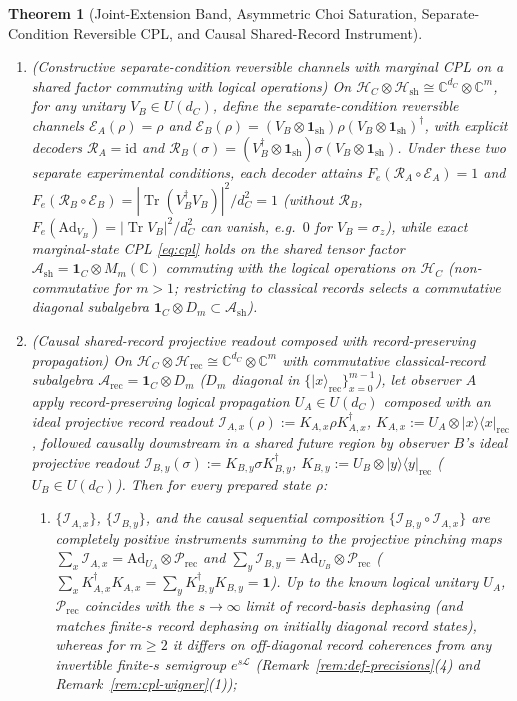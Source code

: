 \documentclass[11pt,a4paper]{article}
\newtheorem{theorem}{Theorem}
\theoremstyle{definition}
\theoremstyle{remark}
\newcommand{\Tr}{\operatorname{Tr}}
\newcommand{\id}{\mathrm{id}}
\newcommand{\cH}{\mathcal{H}}
\newcommand{\cA}{\mathcal{A}}
\newcommand{\cL}{\mathcal{L}}
\newcommand{\cE}{\mathcal{E}}
\newcommand{\cR}{\mathcal{R}}
\newcommand{\cP}{\mathcal{P}}
\newcommand{\cI}{\mathcal{I}}
\newcommand{\bbC}{\mathbb{C}}
\newcommand{\1}{\mathbf{1}}
\begin{document}
\begin{theorem}[Joint-Extension Band, Asymmetric Choi Saturation, Separate-Condition Reversible CPL, and Causal Shared-Record Instrument]
\begin{enumerate}
  \item[(d)] \emph{(Constructive separate-condition reversible channels with marginal CPL on a shared factor commuting with logical operations)} On $\cH_C \otimes \cH_{\mathrm{sh}} \cong \bbC^{d_C} \otimes \bbC^m$, for any unitary $V_B \in U(d_C)$, define the separate-condition reversible channels $\cE_A(\rho) = \rho$ and $\cE_B(\rho) = (V_B\otimes\1_{\mathrm{sh}})\rho(V_B\otimes\1_{\mathrm{sh}})^\dagger$, with explicit decoders $\cR_A = \id$ and $\cR_B(\sigma) = (V_B^\dagger\otimes\1_{\mathrm{sh}})\sigma(V_B\otimes\1_{\mathrm{sh}})$. Under these two separate experimental conditions, each decoder attains $F_e(\cR_A\circ\cE_A) = 1$ and $F_e(\cR_B\circ\cE_B) = |\Tr(V_B^\dagger V_B)|^2/d_C^2 = 1$ (without $\cR_B$, $F_e(\mathrm{Ad}_{V_B}) = |\Tr V_B|^2/d_C^2$ can vanish, e.g.\ $0$ for $V_B = \sigma_z$), while exact marginal-state CPL \eqref{eq:cpl} holds on the shared tensor factor $\cA_{\mathrm{sh}} = \1_C \otimes M_m(\bbC)$ commuting with the logical operations on $\cH_C$ (non-commutative for $m > 1$; restricting to classical records selects a commutative diagonal subalgebra $\1_C\otimes D_m \subset \cA_{\mathrm{sh}}$).
  \item[(e)] \emph{(Causal shared-record projective readout composed with record-preserving propagation)} On $\cH_C \otimes \cH_{\mathrm{rec}} \cong \bbC^{d_C}\otimes\bbC^m$ with commutative classical-record subalgebra $\cA_{\mathrm{rec}} = \1_C\otimes D_m$ ($D_m$ diagonal in $\{|x\rangle_{\mathrm{rec}}\}_{x=0}^{m-1}$), let observer $A$ apply record-preserving logical propagation $U_A\in U(d_C)$ composed with an \emph{ideal projective record readout} $\cI_{A,x}(\rho) := K_{A,x}\rho K_{A,x}^\dagger$, $K_{A,x} := U_A \otimes |x\rangle\langle x|_{\mathrm{rec}}$, followed causally downstream in a shared future region by observer $B$'s ideal projective readout $\cI_{B,y}(\sigma) := K_{B,y}\sigma K_{B,y}^\dagger$, $K_{B,y} := U_B \otimes |y\rangle\langle y|_{\mathrm{rec}}$ ($U_B\in U(d_C)$). Then for every prepared state $\rho$:
  \begin{enumerate}
    \item[(i)] $\{\cI_{A,x}\}$, $\{\cI_{B,y}\}$, and the causal sequential composition $\{\cI_{B,y}\circ\cI_{A,x}\}$ are completely positive instruments summing to the projective pinching maps $\sum_x \cI_{A,x} = \mathrm{Ad}_{U_A}\otimes\cP_{\mathrm{rec}}$ and $\sum_y \cI_{B,y} = \mathrm{Ad}_{U_B}\otimes\cP_{\mathrm{rec}}$ ($\sum_x K_{A,x}^\dagger K_{A,x} = \sum_y K_{B,y}^\dagger K_{B,y} = \1$). Up to the known logical unitary $U_A$, $\cP_{\mathrm{rec}}$ coincides with the $s\to\infty$ limit of record-basis dephasing (and matches finite-$s$ record dephasing on initially diagonal record states), whereas for $m\ge 2$ it differs on off-diagonal record coherences from any invertible finite-$s$ semigroup $e^{s\cL}$ (Remark~\ref{rem:def-precisions}(4) and Remark~\ref{rem:cpl-wigner}(1));

\end{enumerate}
\end{enumerate}
\end{theorem}
\end{document}
